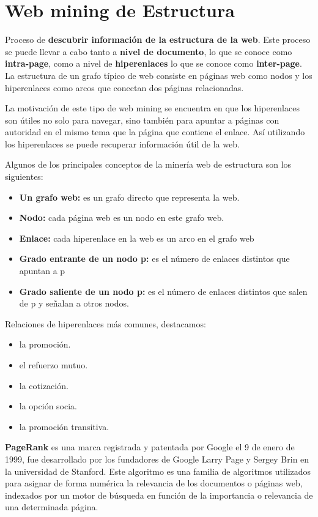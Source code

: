\documentclass[12pt, twoside, openright]{report} %
\begin{document}
\section{Web mining de Estructura}
Proceso de \textbf{descubrir información de la estructura de la web}. Este proceso se puede llevar a cabo tanto a \textbf{nivel de documento}, lo que se conoce como \textbf{intra-page}, como a nivel de \textbf{hiperenlaces} lo que se conoce como \textbf{inter-page}. La estructura de un grafo típico de web consiste en páginas web como nodos y los hiperenlaces como arcos que conectan dos páginas relacionadas.

La motivación de este tipo de web mining se encuentra en que los hiperenlaces son útiles no solo para navegar, sino también para apuntar a páginas con autoridad en el mismo tema que la página que contiene el enlace. Así utilizando los hiperenlaces se puede recuperar información útil de la web.

Algunos de los principales conceptos de la minería web de estructura son los siguientes:
\begin{itemize}
	\item \textbf{Un grafo web:} es un grafo directo que representa la web.
	\item \textbf{Nodo:} cada página web es un nodo en este grafo web.
	\item \textbf{Enlace:} cada hiperenlace en la web es un arco en el grafo web
	\item \textbf{Grado entrante de un nodo p:} es el número de enlaces distintos que apuntan a p
	\item \textbf{Grado saliente de un nodo p:} es el número de enlaces distintos que salen de p y señalan a otros nodos.
\end{itemize}
\pagebreak

Relaciones de hiperenlaces más comunes, destacamos:
\begin{itemize}
	\item la promoción.
	\item el refuerzo mutuo.
	\item la cotización.
	\item la opción socia.
	\item la promoción transitiva.
\end{itemize}

\textbf{PageRank} es una marca registrada y patentada por Google el 9 de enero de 1999, fue desarrollado por los fundadores de Google Larry Page y Sergey Brin en la universidad de Stanford. Este algoritmo es una familia de algoritmos utilizados para asignar de forma numérica la relevancia de los documentos o páginas web, indexados por un motor de búsqueda en función de la importancia o relevancia de una determinada página.
\end{document}
